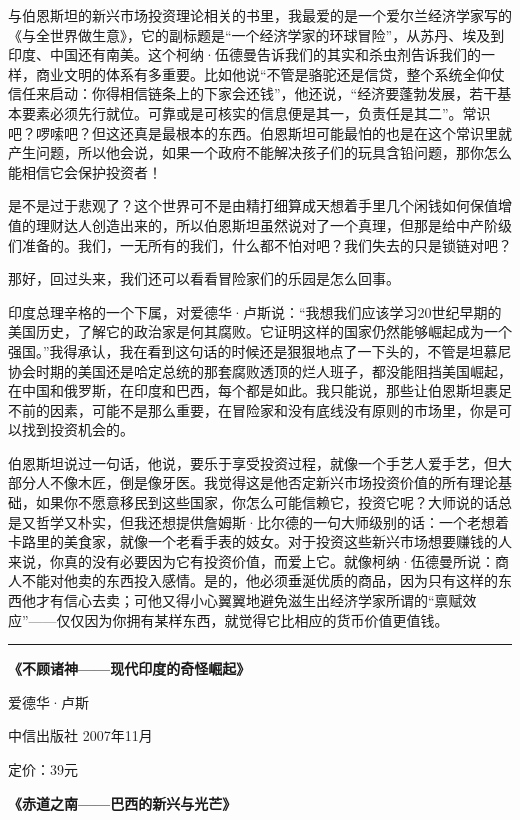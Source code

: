与伯恩斯坦的新兴市场投资理论相关的书里，我最爱的是一个爱尔兰经济学家写的《与全世界做生意》，它的副标题是``一个经济学家的环球冒险''，从苏丹、埃及到印度、中国还有南美。这个柯纳·伍德曼告诉我们的其实和杀虫剂告诉我们的一样，商业文明的体系有多重要。比如他说``不管是骆驼还是信贷，整个系统全仰仗信任来启动：你得相信链条上的下家会还钱''，他还说，``经济要蓬勃发展，若干基本要素必须先行就位。可靠或是可核实的信息便是其一，负责任是其二''。常识吧？啰嗦吧？但这还真是最根本的东西。伯恩斯坦可能最怕的也是在这个常识里就产生问题，所以他会说，如果一个政府不能解决孩子们的玩具含铅问题，那你怎么能相信它会保护投资者！

是不是过于悲观了？这个世界可不是由精打细算成天想着手里几个闲钱如何保值增值的理财达人创造出来的，所以伯恩斯坦虽然说对了一个真理，但那是给中产阶级们准备的。我们，一无所有的我们，什么都不怕对吧？我们失去的只是锁链对吧？

那好，回过头来，我们还可以看看冒险家们的乐园是怎么回事。

印度总理辛格的一个下属，对爱德华·卢斯说：``我想我们应该学习20世纪早期的美国历史，了解它的政治家是何其腐败。它证明这样的国家仍然能够崛起成为一个强国。''我得承认，我在看到这句话的时候还是狠狠地点了一下头的，不管是坦慕尼协会时期的美国还是哈定总统的那套腐败透顶的烂人班子，都没能阻挡美国崛起，在中国和俄罗斯，在印度和巴西，每个都是如此。我只能说，那些让伯恩斯坦裹足不前的因素，可能不是那么重要，在冒险家和没有底线没有原则的市场里，你是可以找到投资机会的。

伯恩斯坦说过一句话，他说，要乐于享受投资过程，就像一个手艺人爱手艺，但大部分人不像木匠，倒是像牙医。我觉得这是他否定新兴市场投资价值的所有理论基础，如果你不愿意移民到这些国家，你怎么可能信赖它，投资它呢？大师说的话总是又哲学又朴实，但我还想提供詹姆斯·比尔德的一句大师级别的话：一个老想着卡路里的美食家，就像一个老看手表的妓女。对于投资这些新兴市场想要赚钱的人来说，你真的没有必要因为它有投资价值，而爱上它。就像柯纳·伍德曼所说：商人不能对他卖的东西投入感情。是的，他必须垂涎优质的商品，因为只有这样的东西他才有信心去卖；可他又得小心翼翼地避免滋生出经济学家所谓的``禀赋效应''------仅仅因为你拥有某样东西，就觉得它比相应的货币价值更值钱。

\begin{center}\rule{0.5\linewidth}{0.5pt}\end{center}

\textbf{《不顾诸神------现代印度的奇怪崛起》}

爱德华·卢斯

中信出版社 2007年11月

定价：39元

\textbf{《赤道之南------巴西的新兴与光芒》}

